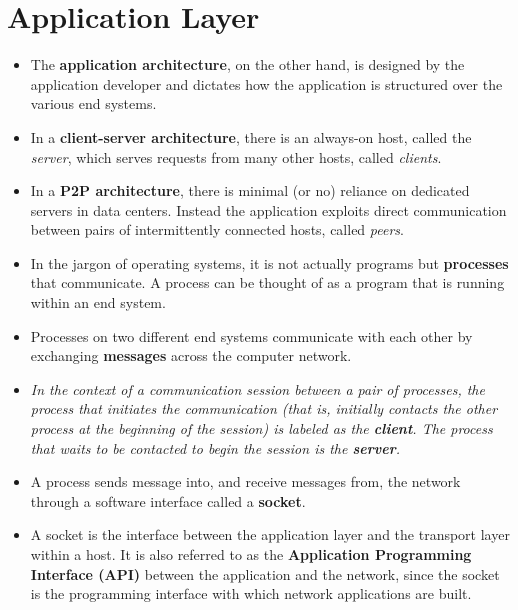 \section{Application Layer}
\begin{itemize}

\item The \textbf{application architecture}, on the other hand, is designed by the application developer and dictates how the application is structured over the various end systems.

\item In a \textbf{client-server architecture}, there is an always-on host, called the \textit{server}, which serves requests from many other hosts, called \textit{clients}.

\item In a \textbf{P2P architecture}, there is minimal (or no) reliance on dedicated servers in data centers. Instead the application exploits direct communication between pairs of intermittently connected hosts, called \textit{peers}.

\item In the jargon of operating systems, it is not actually programs but \textbf{processes} that communicate. A process can be thought of as a program that is running within an end system.

\item Processes on two different end systems communicate with each other by exchanging \textbf{messages} across the computer network.

\item \textit{In the context of a communication session between a pair of processes, the process that initiates the communication (that is, initially contacts the other process at the beginning of the session) is labeled as the \textbf{client}. The process that waits to be contacted to begin the session is the \textbf{server}.}

\item A process sends message into, and receive messages from, the network through a software interface called a \textbf{socket}.

\item A socket is the interface between the application layer and the transport layer within a host. It is also referred to as the \textbf{Application Programming Interface (API)} between the application and the network, since the socket is the programming interface with which network applications are built.


\end{itemize}

